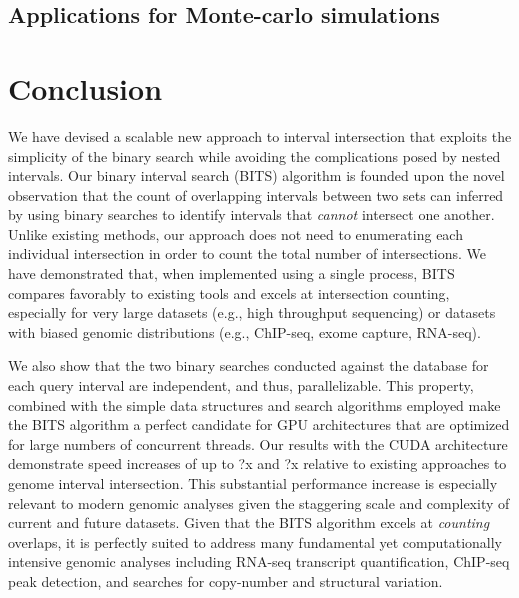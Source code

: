 \documentclass{bioinfo}
\begin{document}
\begin{enumerate}
	

	\subsection{Applications for Monte-carlo simulations}
	

	

	\section{Conclusion}
	
	We have devised a scalable new approach to interval intersection
	that exploits the simplicity of the binary search while avoiding the complications
	posed by nested intervals. Our binary interval search (BITS) algorithm is founded upon the novel 
	observation that the count of overlapping intervals between two sets 
	can inferred by using binary searches to identify intervals that \emph{cannot}
	intersect one another. Unlike existing methods, our approach does not need
	to enumerating each individual intersection in order to count the total number 
	of intersections. We have demonstrated that, when implemented using a single process,
	BITS compares favorably to existing tools and excels at intersection counting, especially
	for very large datasets (e.g., high throughput sequencing) or datasets with biased
	genomic distributions (e.g., ChIP-seq, exome capture, RNA-seq).
	
	We also show that the two binary searches conducted
	against the database for each query interval are independent, and thus, parallelizable.
	This property, combined with the simple data structures and search algorithms employed
	make the BITS algorithm a perfect candidate for GPU architectures that are optimized for
	large numbers of concurrent threads. Our results with the CUDA architecture
	demonstrate speed increases of up to ?x and ?x relative to existing 
	approaches to genome interval intersection. This substantial performance increase 
	is especially relevant to modern genomic analyses given the staggering scale and complexity 
	of current and future datasets.  Given that the BITS algorithm excels at \emph{counting}
	overlaps, it is perfectly suited to address many fundamental yet computationally
	intensive genomic analyses including RNA-seq transcript quantification, ChIP-seq
	peak detection, and searches for copy-number and structural variation.
	

\end{enumerate}
\end{document}
